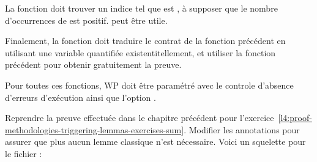 La fonction  doit trouver un indice 
tel que  est , à supposer que le nombre 
d'occurrences de  est positif.  peut
être utile.


Finalement, la fonction  doit traduire le contrat
de la fonction précédent en utilisant une variable quantifiée existentitellement,
et utiliser la fonction précédent pour obtenir gratuitement la preuve.


Pour toutes ces fonctions, WP doit être paramétré avec le controle d'absence
d'erreurs d'exécution ainsi que l'option .




Reprendre la preuve effectuée dans le chapitre précédent pour 
l'exercice~\ref{l4:proof-methodologies-triggering-lemmas-exercises-sum}. Modifier
les annotations pour assurer que plus aucun lemme classique n'est nécessaire.
Voici un squelette pour le fichier :



